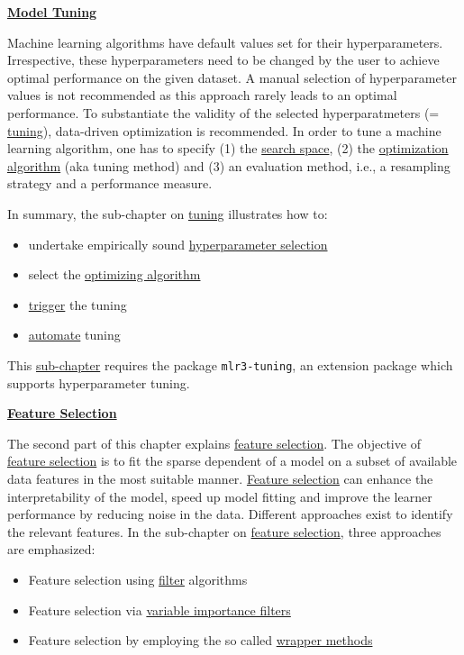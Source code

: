 \documentclass[
  11pt,
  parskip=half,
  DIV=calc,
  BCOR=10mm,
  x11names]{scrbook}
\providecommand{\tightlist}{%
  \setlength{\itemsep}{0pt}\setlength{\parskip}{0pt}}
\begin{document}
\protect\hyperlink{tuning}{\textbf{Model Tuning}}

Machine learning algorithms have default values set for their hyperparameters.
Irrespective, these hyperparameters need to be changed by the user to achieve optimal performance on the given dataset.
A manual selection of hyperparameter values is not recommended as this approach rarely leads to an optimal performance.
To substantiate the validity of the selected hyperparatmeters (= \protect\hyperlink{tuning}{tuning}), data-driven optimization is recommended.
In order to tune a machine learning algorithm, one has to specify (1) the \protect\hyperlink{tuning-optimization}{search space}, (2) the \protect\hyperlink{tuning-optimization}{optimization algorithm} (aka tuning method) and (3) an evaluation method, i.e., a resampling strategy and a performance measure.

In summary, the sub-chapter on \protect\hyperlink{tuning}{tuning} illustrates how to:

\begin{itemize}
\tightlist
\item
  undertake empirically sound \protect\hyperlink{tuning}{hyperparameter selection}
\item
  select the \protect\hyperlink{tuning-optimization}{optimizing algorithm}
\item
  \protect\hyperlink{tuning-triggering}{trigger} the tuning
\item
  \protect\hyperlink{autotuner}{automate} tuning
\end{itemize}

This \protect\hyperlink{tuning}{sub-chapter} requires the package \texttt{mlr3-tuning}, an extension package which supports hyperparameter tuning.

\protect\hyperlink{fs}{\textbf{Feature Selection}}

The second part of this chapter explains \protect\hyperlink{fs}{feature selection}.
The objective of \protect\hyperlink{fs}{feature selection} is to fit the sparse dependent of a model on a subset of available data features in the most suitable manner.
\protect\hyperlink{fs}{Feature selection} can enhance the interpretability of the model, speed up model fitting and improve the learner performance by reducing noise in the data.
Different approaches exist to identify the relevant features.
In the sub-chapter on \protect\hyperlink{fs}{feature selection}, three approaches are emphasized:

\begin{itemize}
\tightlist
\item
  Feature selection using \protect\hyperlink{fs-filter}{filter} algorithms
\item
  Feature selection via \protect\hyperlink{fs-var-imp-filter}{variable importance filters}
\item
  Feature selection by employing the so called \protect\hyperlink{fs-wrapper}{wrapper methods}
\end{itemize}
\end{document}
